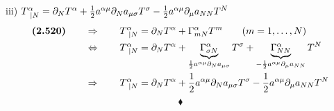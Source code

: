iii) $T^{\alpha}_{\ |N} = \partial_{N}T^{\alpha}  + \frac{1}{2} a^{\alpha\mu} \partial_N a_{\mu\sigma}T^{\sigma} - \frac{1}{2} a^{\alpha\mu}  \partial_{\mu} a_{NN}T^{N}$\\
\begin{align}
\textbf{(2.520)}\quad\quad \Rightarrow \quad\quad T^{\alpha}_{\ |N} &= \partial_{N}T^{\alpha}+\Gamma^{\alpha}_{mN}T^m \quad\quad\text{(}m = 1,\dots,N \text{)}\\
\Leftrightarrow \quad\quad T^{\alpha}_{\ |N} &=  \partial_{N}T^{\alpha}+ \underbrace{\Gamma^{\alpha}_{\sigma N }}_{ \frac{1}{2} a^{\alpha \mu}\partial_N a_{\mu\sigma}}  T^{\sigma }+\underbrace{\Gamma^{\alpha}_{N N}}_{ -\frac{1}{2} a^{\alpha\mu}\partial_{\mu} a_{NN}}T^{N}\\
\Rightarrow \quad\quad T^{\alpha}_{\ |N} &=  \partial_{N}T^{\alpha}+ \frac{1}{2} a^{\alpha \mu}\partial_N a_{\mu\sigma}T^{\sigma } -\frac{1}{2} a^{\alpha\mu}\partial_{\mu} a_{NN}T^{N}
\end{align}
$$\blacklozenge$$
\newpage

